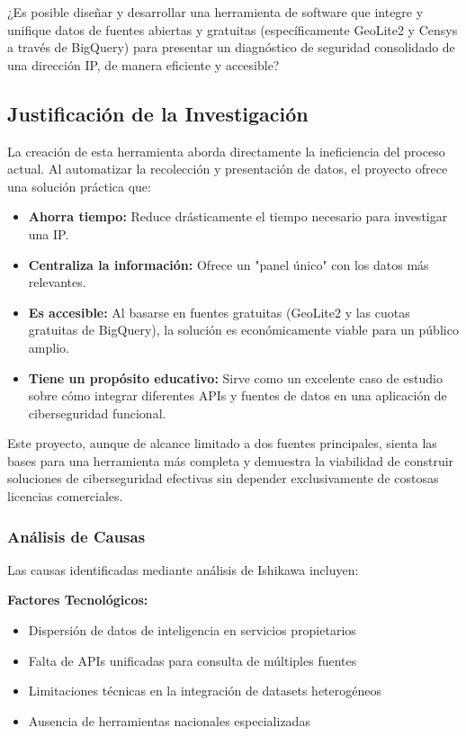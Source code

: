 ¿Es posible diseñar y desarrollar una herramienta de software que integre y unifique datos de fuentes abiertas y gratuitas (específicamente GeoLite2 y Censys a través de BigQuery) para presentar un diagnóstico de seguridad consolidado de una dirección IP, de manera eficiente y accesible?

\subsection{Justificación de la Investigación}

La creación de esta herramienta aborda directamente la ineficiencia del proceso actual. Al automatizar la recolección y presentación de datos, el proyecto ofrece una solución práctica que:
\begin{itemize}
    \item \textbf{Ahorra tiempo:} Reduce drásticamente el tiempo necesario para investigar una IP.
    \item \textbf{Centraliza la información:} Ofrece un "panel único" con los datos más relevantes.
    \item \textbf{Es accesible:} Al basarse en fuentes gratuitas (GeoLite2 y las cuotas gratuitas de BigQuery), la solución es económicamente viable para un público amplio.
    \item \textbf{Tiene un propósito educativo:} Sirve como un excelente caso de estudio sobre cómo integrar diferentes APIs y fuentes de datos en una aplicación de ciberseguridad funcional.
\end{itemize}

Este proyecto, aunque de alcance limitado a dos fuentes principales, sienta las bases para una herramienta más completa y demuestra la viabilidad de construir soluciones de ciberseguridad efectivas sin depender exclusivamente de costosas licencias comerciales.

\subsubsection{Análisis de Causas}
Las causas identificadas mediante análisis de Ishikawa incluyen:

\textbf{Factores Tecnológicos:}
\begin{itemize}
    \item Dispersión de datos de inteligencia en servicios propietarios
    \item Falta de APIs unificadas para consulta de múltiples fuentes
    \item Limitaciones técnicas en la integración de datasets heterogéneos
    \item Ausencia de herramientas nacionales especializadas
\end{itemize}

